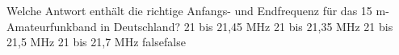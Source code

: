    {Welche Antwort enthält die richtige Anfangs- und Endfrequenz für das 15 m-Amateurfunkband in Deutschland?}
    {21 bis 21,45 MHz}
    {21 bis 21,35 MHz}
    {21 bis 21,5 MHz}
    {21 bis 21,7 MHz}
    {false}{false}